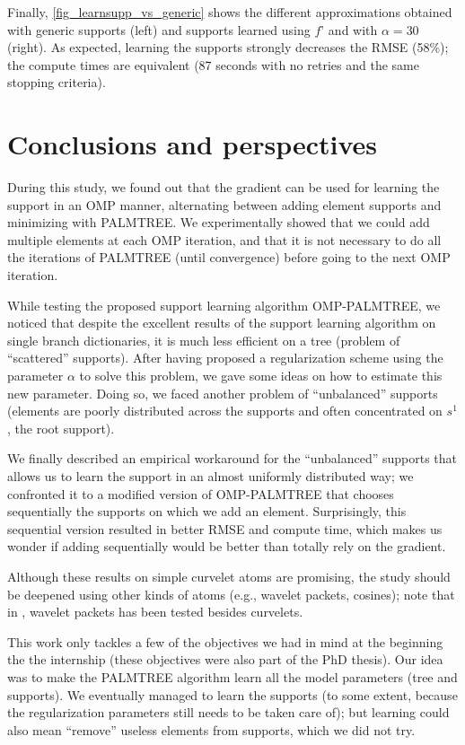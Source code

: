 Finally, \cref{fig_learnsupp_vs_generic} shows the different approximations obtained with generic supports (left) and supports learned using $f’$ and with $\alpha=30$ (right). As expected, learning the supports strongly decreases the RMSE (58\%); the compute times are equivalent (87 seconds with no retries and the same stopping criteria).


\FloatBarrier
\section{Conclusions and perspectives}

 
During this study, we found out that the gradient can be used for learning the support in an \ac{OMP} manner, alternating between adding element supports and minimizing with PALMTREE. We experimentally showed that we could add multiple elements at each OMP iteration, and that it is not necessary to do all the iterations of PALMTREE (until convergence) before going to the next OMP iteration. 

\noindent
While testing the proposed support learning algorithm OMP-PALMTREE, we noticed that despite the excellent results of the support learning algorithm on single branch dictionaries, it is much less efficient on a tree (problem of “scattered” supports). After having proposed a regularization scheme using the parameter $\alpha$ to solve this problem, we gave some ideas on how to estimate this new parameter. Doing so, we faced another problem of “unbalanced” supports (elements are poorly distributed across the supports and often concentrated on $s^1$, the root support). 

\noindent
We finally described an empirical workaround for the “unbalanced” supports that allows us to learn the support in an almost uniformly distributed way; we confronted it to a modified version of OMP-PALMTREE that chooses sequentially the supports on which we add an element. Surprisingly, this sequential version resulted in better RMSE and compute time, which makes us wonder if adding sequentially would be better than totally rely on the gradient.

\noindent
Although these results on simple curvelet atoms are promising, the study should be deepened using other kinds of atoms (e.g., wavelet packets, cosines); note that in \cite{chabiron_optimization_2016}, wavelet packets has been tested besides curvelets.

This work only tackles a few of the objectives we had in mind at the beginning the the internship (these objectives were also part of the PhD thesis). Our idea was to make the PALMTREE algorithm learn all the model parameters (tree and supports). We eventually managed to learn the supports (to some extent, because the regularization parameters still needs to be taken care of); but learning could also mean “remove” useless elements from supports, which we did not try.
 
